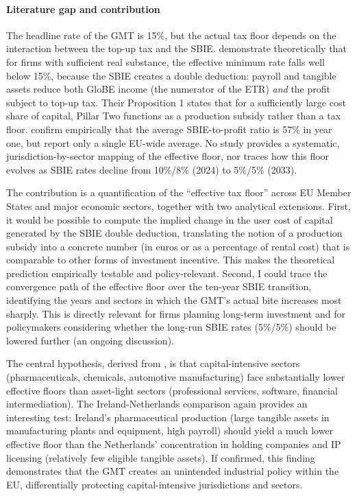 \documentclass[11pt,a4paper]{article}
\begin{document}
\paragraph{Literature gap and contribution} The headline rate of the GMT is 15\%, but the actual tax floor depends on the interaction between the top-up tax and the SBIE. \citet{schjelderup2024} demonstrate theoretically that for firms with sufficient real substance, the effective minimum rate falls well below 15\%, because the SBIE creates a double deduction: payroll and tangible assets reduce both GloBE income (the numerator of the ETR) \textit{and} the profit subject to top-up tax. Their Proposition 1 states that for a sufficiently large cost share of capital, Pillar Two functions as a production subsidy rather than a tax floor. \citet{devereux2023} confirm empirically that the average SBIE-to-profit ratio is 57\% in year one, but report only a single EU-wide average. No study provides a systematic, jurisdiction-by-sector mapping of the effective floor, nor traces how this floor evolves as SBIE rates decline from 10\%/8\% (2024) to 5\%/5\% (2033).

The contribution is a quantification of the ``effective tax floor'' across EU Member States and major economic sectors, together with two analytical extensions. First, it would be possible to compute the implied change in the user cost of capital generated by the SBIE double deduction, translating the notion of a production subsidy into a concrete number (in euros or as a percentage of rental cost) that is comparable to other forms of investment incentive. This makes the \citeauthor{schjelderup2024} theoretical prediction empirically testable and policy-relevant. Second, I could trace the convergence path of the effective floor over the ten-year SBIE transition, identifying the years and sectors in which the GMT's actual bite increases most sharply. This is directly relevant for firms planning long-term investment and for policymakers considering whether the long-run SBIE rates (5\%/5\%) should be lowered further (an ongoing discussion). 

The central hypothesis, derived from \citeauthor{schjelderup2024}, is that capital-intensive sectors (pharmaceuticals, chemicals, automotive manufacturing) face substantially lower effective floors than asset-light sectors (professional services, software, financial intermediation). The Ireland-Netherlands comparison again provides an interesting test: Ireland's pharmaceutical production (large tangible assets in manufacturing plants and equipment, high payroll) should yield a much lower effective floor than the Netherlands' concentration in holding companies and IP licensing (relatively few eligible tangible assets). If confirmed, this finding demonstrates that the GMT creates an unintended industrial policy within the EU, differentially protecting capital-intensive jurisdictions and sectors.
\end{document}
